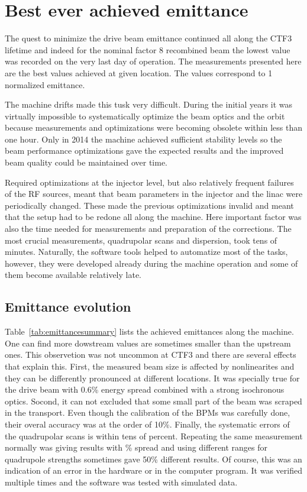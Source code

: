 \section{Best ever achieved emittance}

The quest to minimize the drive beam emittance continued all along the CTF3 lifetime 
and indeed for the nominal factor 8 recombined beam the lowest value was recorded on the very last day of operation.
The measurements presented here are the best values achieved at given location. 
The values correspond to 1~\textsigma~ normalized emittance.

The machine drifts made this tusk very difficult. 
During the initial years it was virtually impossible to systematically optimize the beam optics 
and the orbit because measurements and optimizations were becoming obsolete within less than one hour.
Only in 2014 the machine achieved sufficient stability levels so the beam performance 
optimizations gave the expected results and the improved beam quality could be maintained 
over time. 

Required optimizations at the injector level, 
but also relatively frequent failures of the RF sources,
meant that beam parameters in the injector and the linac were periodically changed.
These made the previous optimizations invalid and 
meant that the setup had to be redone all along the machine.
Here important factor was also the time needed for measurements and preparation of the corrections.
The most crucial measurements, quadrupolar scans and dispersion, took tens of minutes.
Naturally, the software tools helped to automatize most of the tasks, 
however, they were developed already during the machine operation
and some of them become available relatively late.


\subsection{Emittance evolution \label{sec:emittancemeasured}}

Table~\ref{tab:emittancesummary} lists the achieved emittances along the machine.
One can find more dowstream values are sometimes smaller than the upstream ones.
This observetion was not uncommon at CTF3 and there are several effects that explain this.
First, the measured beam size is affected by nonlinearites and 
they can be differently pronounced at different locations. It was specially true 
for the drive beam with 0.6\% energy spread combined with a strong isochronous optics.
Socond, it can not excluded that some small part of the beam was scraped in the transport.
Even though the calibration of the BPMs was carefully done, 
their overal accuracy was at the order of 10\%. 
Finally, the systematic errors of the quadrupolar scans is within tens of percent. 
Repeating the same measurement normally was giving results with \% spread and 
using different ranges for quadrupole strengths sometimes gave 50\% different results.
Of course, this was an indication of an error in the hardware or in the computer program.
It was verified multiple times and the software was tested with simulated data.

